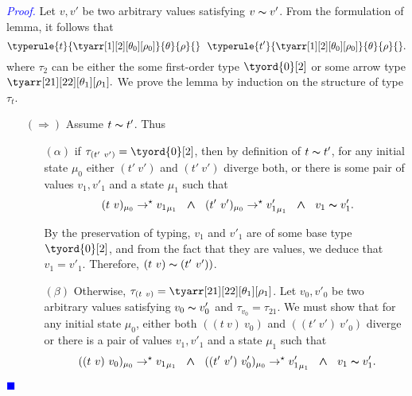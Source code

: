 \documentclass[a4paper,11pt,oneside]{article}
\theoremstyle{plain}
\renewenvironment{proof}{\noindent \textcolor{blue}{\textit{Proof.}}}
{{\begin{tiny}\textcolor{blue}{$\blacksquare$}\end{tiny}}\\}
\newcommand{\tmapp}[2]{(#1 ~ #2)}
\newcommand{\ty}[1][]{\tau_{#1}}
\newcommand{\bwedge}{\boldsymbol{~\wedge~}}
\newcommand{\evalstar}[4]{~#1_{\mu_#2} \rightarrow^{\star} #3_{\mu_#4} ~}
\newcommand{\eqv}[1]{#1 \thicksim #1'}
\begin{document}
	\begin{proof}
		Let $v, v'$ be two arbitrary values satisfying $\eqv{v}$.
		From the formulation of lemma, it follows that
		$$	\typerule{t}{\tyarr[1][2][\theta_0][\rho_0]}{\theta}{\rho}{} ~~ 
				\typerule{t'}{\tyarr[1][2][\theta_0][\rho_0]}{\theta}{\rho}{}.$$
		where $\ty[2]$ can be either the some first-order type $\tyord{0}[2]$ or
		some arrow type $\tyarr[21][22][\theta_1][\rho_1].$ 
		We prove the lemma by induction on the structure of type $\ty[t]$.
	\begin{itemize}		
	
		\item[$(\Rightarrow)$] Assume $\eqv{t}$. Thus 		
		
		\begin{itemize}
		
		\item[$(\alpha)$] if $\ty[\tmapp{t'}{v'}] = \tyord{0}[2]$, then
		by definition of $\eqv{t}$, for any initial state $\mu_0$ either 
		$\tmapp{t'}{v'}$ and $\tmapp{t'}{v'}$ diverge both, 
		or there is some pair of values $v_1, v'_1$ and a state $\mu_1$ such that 
		$$\evalstar{\tmapp{t}{v}}{0}{{v_1}}{1} 
			\bwedge \evalstar{\tmapp{t'}{v'}}{0}{{v'_1}}{1} \bwedge~\eqv{v_1}.$$
		
		By the preservation of typing, $v_1$ and $v'_1$ are of some base 
		type $\tyord{0}[2]$, and from the fact that they are values, we deduce
		that $v_1 = v'_1$. Therefore,  $\tmapp{t}{v} \thicksim \tmapp{t'}{v'})$.
			
		\item[$(\beta)$] Otherwise, 
		$\ty[\tmapp{t}{v}] = \tyarr[21][22][\theta_1][\rho_1]$.
		Let $v_0, v'_0$ be two arbitrary values satisfying $\eqv{v_0}$ and 
		$\ty[v_0] = \ty[21]$. We must show that for any initial state $\mu_0$,
		either both 
		$\tmapp{\tmapp{t}{v}}{v_0}$ and $\tmapp{\tmapp{t'}{v'}}{v'_0}$ diverge
		or there is a pair of values $v_1, v'_1$ and a state $\mu_1$ such that 
		$$\evalstar{\tmapp{\tmapp{t}{v}}{v_0}}{0}{{v_1}}{1} \bwedge
		\evalstar{\tmapp{\tmapp{t'}{v'}}{v'_0}}{0}{{v'_1}}{1} \bwedge~\eqv{v_1}.$$
		

\end{itemize}
\end{itemize}
\end{proof}
\end{document}

